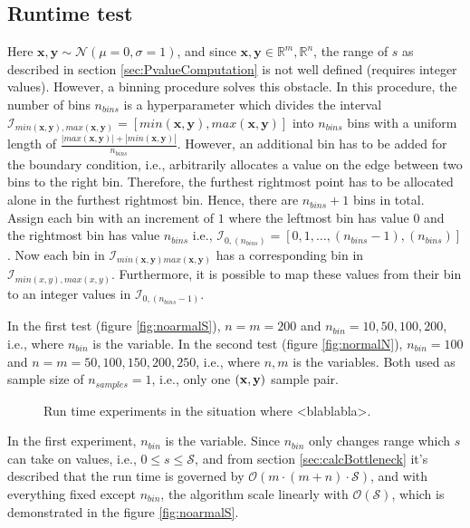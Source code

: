 \documentclass[a4paper,11pt]{article}
\begin{document}
\subsection{Runtime test}
Here $\bm{x},\bm{y} \sim \mathcal{N}(\mu = 0,\sigma =1)$, and since $\bm{x},\bm{y} \in \mathbb{R}^{m}, \mathbb{R}^{n}$, the range of $s$ as described in section \ref{sec:PvalueComputation} is not well defined (requires integer values). However, a binning procedure solves this obstacle. In this procedure, the number of bins $n_{bins}$ is a hyperparameter which divides the interval $\mathcal{I}_{min(\bm{x},\bm{y}), max(\bm{x},\bm{y})}=[ min(\bm{x},\bm{y}), max(\bm{x},\bm{y}) ]$ into $n_{bins}$ bins with a uniform length of $\frac{|max(\bm{x},\bm{y})| + |min(\bm{x},\bm{y})|}{n_{bins}}$. However, an additional bin has to be added for the boundary condition, i.e., arbitrarily allocates a value on the edge between two bins to the right bin. Therefore, the furthest rightmost point has to be allocated alone in the furthest rightmost bin. Hence, there are $n_{bins}+1$ bins in total. Assign each bin with an increment of $1$ where the leftmost bin has value $0$ and the rightmost bin has value $n_{bins}$ i.e., $\mathcal{I}_{0, (n_{bins})}=[0,1,\ldots,(n_{bins}-1),(n_{bins})]$. Now each bin in $\mathcal{I}_{min(\bm{x},\bm{y}) max(\bm{x},\bm{y})}$ has a corresponding bin in $\mathcal{I}_{min(x,y), max(x,y)}$. Furthermore, it is possible to map these values from their bin to an integer values in $\mathcal{I}_{0, (n_{bins}-1)}$.


In the first test (figure \ref{fig:noarmalS}), $n=m=200$ and $n_{bin}=10,50,100,200$, i.e., where $n_{bin}$ is the variable. In the second test (figure \ref{fig:normalN}), $n_{bin}=100$ and $n=m=50, 100,150,200,250$, i.e., where $n,m$ is the variables. Both used as sample size of $n_{samples}=1$, i.e., only one $(\bf{x}, \bf{y})$ sample pair.

\FloatBarrier
\begin{figure}[!tbp]
  \centering
  \hfill
  \caption{Run time experiments in the situation where \textless blablabla\textgreater.}
\end{figure}
\FloatBarrier

In the first experiment, $n_{bin}$ is the variable. Since $n_{bin}$ only changes range which $s$ can take on values, i.e., $0 \leq s \leq \mathcal{S}$, and from section \ref{sec:calcBottleneck} it's described that the run time is governed by $\mathcal{O}(m\cdot (m+n)\cdot \mathcal{S})$, and with everything fixed except $n_{bin}$, the algorithm scale linearly with $\mathcal{O}(\mathcal{S})$, which is demonstrated in the figure \ref{fig:noarmalS}.
\end{document}
